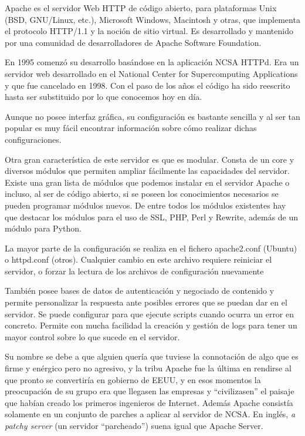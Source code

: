 Apache es el servidor Web HTTP de código abierto, para plataformas Unix (BSD, GNU/Linux, etc.), Microsoft Windows, Macintosh y otras, que implementa el protocolo HTTP/1.1 y la noción de sitio virtual.  Es desarrollado y mantenido por una comunidad de desarrolladores de Apache Software Foundation.


En 1995 comenzó su desarrollo basándose en la aplicación NCSA HTTPd. Era un servidor web desarrollado en el National Center for Supercomputing Applications y que fue cancelado en 1998. Con el paso de los años el código ha sido reescrito hasta ser substituido por lo que conocemos hoy en día.


Aunque no posee interfaz gráfica, su configuración es bastante sencilla y al ser tan popular es muy fácil encontrar información sobre cómo realizar dichas configuraciones. 

Otra gran característica de este servidor es que es modular. Consta de un core y diversos módulos que permiten ampliar fácilmente las capacidades del servidor. Existe una gran lista de módulos que podemos instalar en el servidor Apache o incluso, al ser de código abierto, si se poseen los conocimientos necesarios se pueden programar módulos nuevos. De entre todos los módulos existentes hay que destacar los módulos para el uso de SSL, PHP, Perl y Rewrite, además de un módulo para Python. 

La mayor parte de la configuración se realiza en el fichero apache2.conf (Ubuntu) o httpd.conf (otros). Cualquier cambio en este archivo requiere reiniciar el servidor, o forzar la lectura de los archivos de configuración nuevamente

También posee bases de datos de autenticación y negociado de contenido y permite personalizar la respuesta ante posibles errores que se puedan dar en el servidor. Se puede configurar para que ejecute scripts cuando ocurra un error en concreto. Permite con mucha facilidad la creación y gestión de logs para tener un mayor control sobre lo que sucede en el servidor.


Su nombre se debe a que alguien quería que tuviese la connotación de algo que es firme y enérgico pero no agresivo, y la tribu Apache fue la última en rendirse al que pronto se convertiría en gobierno de EEUU, y en esos momentos la preocupación de su grupo era que llegasen las empresas y ``civilizasen'' el paisaje que habían creado los primeros ingenieros de Internet. Además Apache consistía solamente en un conjunto de parches a aplicar al servidor de NCSA. En inglés, \textit{a patchy server} (un servidor ``parcheado'') suena igual que Apache Server.



